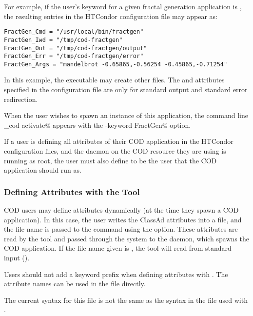 For example, if the user's keyword for a given fractal generation
application is , the resulting entries in the HTCondor
configuration file may appear as:

\begin{verbatim}
FractGen_Cmd = "/usr/local/bin/fractgen"
FractGen_Iwd = "/tmp/cod-fractgen"
FractGen_Out = "/tmp/cod-fractgen/output"
FractGen_Err = "/tmp/cod-fractgen/error"
FractGen_Args = "mandelbrot -0.65865,-0.56254 -0.45865,-0.71254"
\end{verbatim}

In this example, the executable may create other files.
The  and  attributes specified in the
configuration file are only for standard output and standard error
redirection.

When the user wishes to spawn an instance of this application,
the command line 
  \verb@condor_cod  activate@
appears with the
  \verb@-keyword FractGen@
option.

\Note If a user is defining all attributes of their COD application in
the HTCondor configuration files, and the  daemon on the COD
resource they are using is running as root, the user must also define
 to be the user that the COD application should run as.


\subsubsection{\label{sec:cod-command-line-attrs}
Defining Attributes with the  Tool} 

COD users may define attributes dynamically (at the time they spawn a
COD application).
In this case, the user writes the ClassAd attributes into a file, and the
file name is passed to the   command  using the
 option.
These attributes are read by the  tool and passed through
the system to the  daemon, which spawns the COD application. 
If the file name given is \File{-}, the  tool will read
from standard input ().

Users should not add a keyword prefix 
when defining attributes with  .
The attribute names can be used in the file directly.

\Warn The current syntax for this file is not the same as the syntax
in the file used with .


